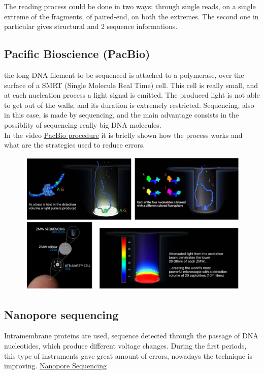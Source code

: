 The reading process could be done in two ways: through single reads, on a single extreme of the fragments, of paired-end, on both the extremes. The second one in particular gives structural and 2 sequence  informations.


\subsection{Pacific Bioscience (PacBio)}
the long DNA filement to be sequenced is attached to a polymerase, over the surface of a SMRT (Single Molecule Real Time) cell. This cell is really small, and at each nucleation process a light signal is emitted. The produced light is not able to get out of the walls, and its duration is extremely restricted. Sequencing, also in this case, is made by sequencing, and the main advantage consists in the possiblity of sequencing really big DNA molecules.\\
In the video \href{https://www.youtube.com/watch?v=_lD8JyAbwEo}{PacBio procedure} it is briefly shown how the process works and what are the strategies used to reduce errors.

\begin{figure}[h]
\caption{}
\centering
\includegraphics[width=1\textwidth]{PacBIO}
\label{}
\end{figure}


\subsection{Nanopore sequencing}
Intramembrane proteins are used, sequence detected through the passage of DNA nucleotides, which produce different voltage changes. During the first periods, this type of instruments gave great amount of errors, nowadays the technique is improving.
\href{https://www.youtube.com/watch?v=E9-Rm5AoZGw}{Nanopore Sequencing}
